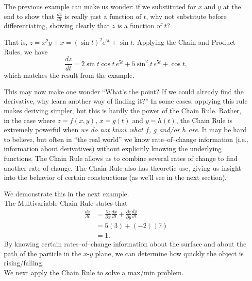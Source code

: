 The previous example can make us wonder: if we substituted for $x$ and $y$ at the end to show that $\frac{dz}{dt}$ is really just a function of $t$, why not substitute before differentiating, showing clearly that $z$ is a function of $t$?

That is, $z = x^2y+x = (\sin t)^2e^{5t}+\sin t.$ Applying the Chain and Product Rules, we have 
$$\frac{dz}{dt} = 2\sin t\cos t\, e^{5t}+ 5\sin^2t\,e^{5t}+\cos t,$$ which matches the result from the example.

This may now make one wonder ``What's the point? If we could already find the derivative, why learn another way of finding it?'' In some cases, applying this rule makes deriving simpler, but this is hardly the power of the Chain Rule. Rather, in the case where $z=f(x,y)$, $x=g(t)$ and $y=h(t)$, the Chain Rule is extremely powerful when \textit{we do not know what $f$, $g$ and/or $h$ are}. It may be hard to believe, but often in ``the real world'' we know rate--of--change information (i.e., information about derivatives) without explicitly knowing the underlying functions. The Chain Rule allows us to combine several rates of change to find another rate of change. The Chain Rule also has theoretic use, giving us insight into the behavior of certain constructions (as we'll see in the next section).

We demonstrate this in the next example.\\

{The Multivariable Chain Rule states that 
\begin{align*}
\frac{dz}{dt} &= \frac{\partial z}{\partial x}\frac{dx}{dt} + \frac{\partial z}{\partial y}\frac{dy}{dt} \\
				&= 5(3)+(-2)(7) \\
				&=1.
\end{align*}
By knowing certain rates--of--change information about the surface and about the path of the particle in the $x$-$y$ plane, we can determine how quickly the object is rising/falling. 
}\\

We next apply the Chain Rule to solve a max/min problem.\\

